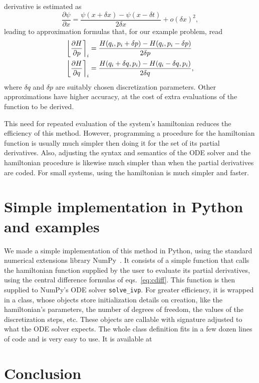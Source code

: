 \documentclass{iopart}
\newcommand{\numap}[1]{\ensuremath{%
    \left\lfloor#1\right\rceil
}}
\begin{document}
derivative is estimated as
\begin{equation}\label{eq:cdiff}
  \frac{\partial\psi}{\partial x} = 
    \frac{\psi(x+\delta x)-\psi(x-\delta t)}{2\delta x}+
  o(\delta x)^2,
\end{equation}
leading to approximation formulas that, for our example problem, read 
\begin{align}
  \numap{\frac{\partial H}{\partial p}}_i &=
  \frac{H(q_i, p_i+\delta p)-H(q_i, p_i-\delta p)}{2\delta p}\\
  \numap{\frac{\partial H}{\partial q}}_i &=
  \frac{H(q_i+\delta q, p_i)-H(q_i-\delta q, p_i)}{2\delta q},
\end{align}
where $\delta q$ and $\delta p$ are suitably chosen discretization parameters.
Other approximations have higher accuracy, at the cost of extra evaluations of
the function to be derived.

This need for repeated evaluation of the system's hamiltonian reduces the
efficiency of this method. However, programming a procedure for the hamiltonian
function is usually much simpler then doing it for the set of its partial
derivatives.  Also, adjusting the syntax and semantics of the ODE solver and the
hamiltonian procedure is likewise much simpler than when the partial derivatives
are coded.  For small systems, using the hamiltonian is much simpler and faster.



\section{Simple implementation in Python and examples}
We made a simple implementation of this method in Python, using the standard
numerical extensions library NumPy~\cite{numpy:2011,numpy:2020}.  It consists of
a simple function that calls the hamiltonian function supplied by the user to
evaluate its partial derivatives, using the central difference formulas of
eqs.~\eqref{eq:cdiff}. This function is then supplied to NumPy's ODE solver
\texttt{solve\_ivp}.  For greater efficiency, it is wrapped in a class, whose
objects store initialization details on creation, like the hamiltonian's
parameters, the number of degrees of freedom, the values of the discretization
steps, etc. These objects are callable with signature adjusted to what the ODE
solver expects.  The whole class definition fits in a few dozen lines of code
and is very easy to use. It is available at 

\section{Conclusion}
\end{document}
